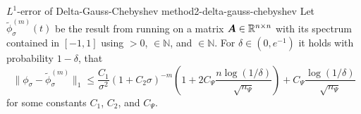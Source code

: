 \begin{theorem}{$L^1$-error of Delta-Gauss-Chebyshev method}{2-delta-gauss-chebyshev}
    Let $\widetilde{\phi}_{\sigma}^{(m)}(t)$ be the result from running 
    on a matrix $\boldsymbol{A} \in \mathbb{R}^{n \times n}$ with its spectrum contained in $[-1, 1]$ using
     $>0$,  $\in \mathbb{N}$, and
     $\in \mathbb{N}$. For $\delta \in (0, e^{-1})$ it holds with
    probability $1-\delta$, that
    \begin{equation}
        \lVert \phi_{\sigma} - \widetilde{\phi}_{\sigma}^{(m)}\rVert _1
        \leq \frac{C_1}{\sigma^2} (1 + C_2 \sigma)^{-m} \left( 1 + 2 C_{\Psi} \frac{n \log(1/\delta)}{\sqrt{n_{\Psi}}} \right) + C_{\Psi} \frac{\log(1/\delta)}{\sqrt{n_{\Psi}}}
    \end{equation}
    for some constants $C_1$, $C_2$, and $C_{\Psi}$.
\end{theorem}

